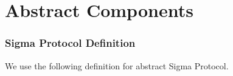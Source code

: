 \section{Abstract Components}
\subsubsection{Sigma Protocol Definition}
We use the following definition for abstract Sigma Protocol. 
